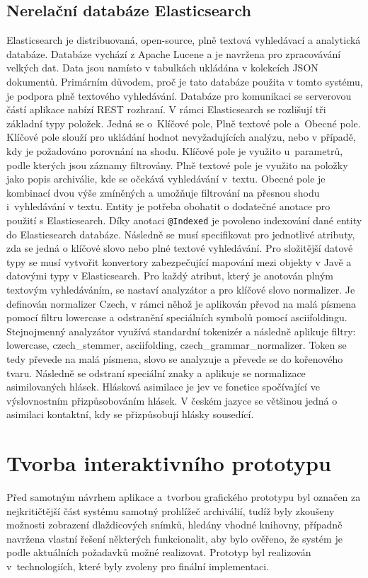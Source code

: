 \subsection{Nerelační databáze Elasticsearch}
Elasticsearch \cite{elasticsearch} je distribuovaná, open-source, plně textová vyhledávací a analytická databáze. Databáze vychází z Apache Lucene a je navržena pro zpracovávání velkých dat. Data jsou namísto v tabulkách ukládána v kolekcích JSON dokumentů. Primárním důvodem, proč je tato databáze použita v tomto systému, je podpora plně textového vyhledávání. Databáze pro komunikaci se serverovou částí aplikace nabízí REST rozhraní.
\newpara
V rámci Elasticsearch se rozlišují tři základní typy položek. Jedná se o~Klíčové pole, Plně textové pole a~Obecné pole. Klíčové pole slouží pro ukládání hodnot nevyžadujících analýzu, nebo v případě, kdy je požadováno porovnání na shodu. Klíčové pole je využito u~parametrů, podle kterých jsou záznamy filtrovány. Plně textové pole je využito na položky jako popis archiválie, kde se očekává vyhledávání v~textu. Obecné pole je kombinací dvou výše zmíněných a umožňuje filtrování na přesnou shodu i~vyhledávání v textu.
\newpara
Entity je potřeba obohatit o dodatečné anotace pro použití s Elasticsearch. Díky anotaci \texttt{@Indexed} je povoleno indexování dané entity do Elasticsearch databáze. Následně se musí specifikovat pro jednotlivé atributy, zda se jedná o klíčové slovo nebo plné textové vyhledávání. Pro složitější datové typy se musí vytvořit konvertory zabezpečující mapování mezi objekty v Javě a datovými typy v Elasticsearch. Pro každý atribut, který je anotován plným textovým vyhledáváním, se nastaví analyzátor a pro klíčové slovo normalizer. Je definován normalizer Czech, v rámci něhož je aplikován převod na malá písmena pomocí filtru lowercase a odstranění speciálních symbolů pomocí asciifoldingu. Stejnojmenný analyzátor využívá standardní tokenizér a následně aplikuje filtry: lowercase, czech\_stemmer, asciifolding, czech\_grammar\_normalizer. Token se tedy převede na malá písmena, slovo se analyzuje a převede se do kořenového tvaru. Následně se odstraní speciální znaky a aplikuje se normalizace asimilovaných hlásek. Hlásková asimilace \cite{hlaskovaAsimilace} je jev ve fonetice spočívající ve výslovnostním přizpůsobováním hlásek. V českém jazyce se většinou jedná o asimilaci kontaktní, kdy se přizpůsobují hlásky sousedící.


\section{Tvorba interaktivního prototypu}
\label{sec:funkcni-prototyp}
Před samotným návrhem aplikace a~tvorbou grafického prototypu byl označen za nejkritičtější část systému samotný prohlížeč archiválií, tudíž byly zkoušeny možnosti zobrazení dlaždicových snímků, hledány vhodné knihovny, případně navržena vlastní řešení některých funkcionalit, aby bylo ověřeno, že systém je podle aktuálních požadavků možné realizovat. Prototyp byl realizován v~technologiích, které byly zvoleny pro finální implementaci.

